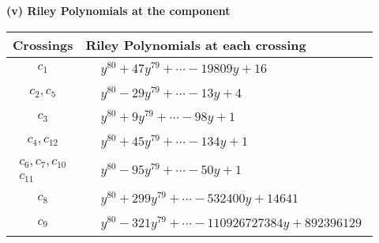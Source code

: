 \documentclass[1p]{elsarticle_modified}
\theoremstyle{definition}
\begin{document}
\newpage\renewcommand{\arraystretch}{1}
\flushleft \textbf{(v) Riley Polynomials at the component}\newline \\
\begin{tabular}{m{50pt}|m{274pt}}
Crossings & \hspace{64pt}Riley Polynomials at each crossing \\
\hline $$\begin{aligned}c_{1}\end{aligned}$$&$\begin{aligned}
&y^{80}+47 y^{79}+\cdots-19809 y+16
\end{aligned}$\\
\hline $$\begin{aligned}c_{2},c_{5}\end{aligned}$$&$\begin{aligned}
&y^{80}-29 y^{79}+\cdots-13 y+4
\end{aligned}$\\
\hline $$\begin{aligned}c_{3}\end{aligned}$$&$\begin{aligned}
&y^{80}+9 y^{79}+\cdots-98 y+1
\end{aligned}$\\
\hline $$\begin{aligned}c_{4},c_{12}\end{aligned}$$&$\begin{aligned}
&y^{80}+45 y^{79}+\cdots-134 y+1
\end{aligned}$\\
\hline $$\begin{aligned}c_{6},c_{7},c_{10}\\c_{11}\end{aligned}$$&$\begin{aligned}
&y^{80}-95 y^{79}+\cdots-50 y+1
\end{aligned}$\\
\hline $$\begin{aligned}c_{8}\end{aligned}$$&$\begin{aligned}
&y^{80}+299 y^{79}+\cdots-532400 y+14641
\end{aligned}$\\
\hline $$\begin{aligned}c_{9}\end{aligned}$$&$\begin{aligned}
&y^{80}-321 y^{79}+\cdots-110926727384 y+892396129
\end{aligned}$\\
\hline
\end{tabular}\\~\\
\end{document}
